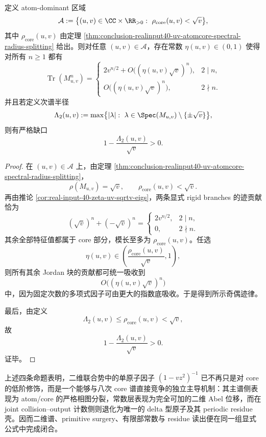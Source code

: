 \begin{theorem}\label{thm:conclusion-realinput40-uv-atom-dominant-trace-law}
定义 atom-dominant 区域
\[
\mathcal A:=
\bigl\{(u,v)\in\CC\times\RR_{>0}:\ \rho_{\mathrm{core}}(u,v)<\sqrt v\bigr\},
\]
其中 \(\rho_{\mathrm{core}}(u,v)\) 由定理 \ref{thm:conclusion-realinput40-uv-atomcore-spectral-radius-splitting} 给出。则对任意 \((u,v)\in\mathcal A\)，存在常数 \(\eta(u,v)\in(0,1)\) 使得对所有 \(n\ge 1\) 都有
\[
\operatorname{Tr}(M_{u,v}^n)=
\begin{cases}
2v^{n/2}+O\!\bigl((\eta(u,v)\sqrt v)^n\bigr),& 2\mid n,\\[4pt]
O\!\bigl((\eta(u,v)\sqrt v)^n\bigr),& 2\nmid n.
\end{cases}
\]
并且若定义次谱半径
\[
\Lambda_2(u,v):=
\max\bigl\{|\lambda|:\ \lambda\in\Spec(M_{u,v})\setminus\{\pm\sqrt v\}\bigr\},
\]
则有严格缺口
\[
\boxed{\;
1-\frac{\Lambda_2(u,v)}{\sqrt v}>0.\;}
\]
\end{theorem}
\begin{proof}
在 \((u,v)\in\mathcal A\) 上，由定理 \ref{thm:conclusion-realinput40-uv-atomcore-spectral-radius-splitting}，
\[
\rho(M_{u,v})=\sqrt v,
\qquad
\rho_{\mathrm{core}}(u,v)<\sqrt v.
\]
再由推论 \ref{cor:real-input-40-zeta-uv-sqrtv-eigs}，两条显式 rigid branches 的迹贡献恰为
\[
(\sqrt v)^n+(-\sqrt v)^n
=
\begin{cases}
2v^{n/2},&2\mid n,\\
0,&2\nmid n.
\end{cases}
\]
其余全部特征值都属于 core 部分，模长至多为 \(\rho_{\mathrm{core}}(u,v)\)。任选
\[
\eta(u,v)\in\left(\frac{\rho_{\mathrm{core}}(u,v)}{\sqrt v},1\right),
\]
则所有其余 Jordan 块的贡献都可统一吸收到
\[
O\!\bigl((\eta(u,v)\sqrt v)^n\bigr)
\]
中，因为固定次数的多项式因子可由更大的指数底吸收。于是得到所示奇偶迹律。

最后，由定义
\[
\Lambda_2(u,v)\le \rho_{\mathrm{core}}(u,v)<\sqrt v,
\]
故
\[
1-\frac{\Lambda_2(u,v)}{\sqrt v}>0.
\]
证毕。
\end{proof}

上述四条命题表明，二维联合势中的单原子因子 \((1-vz^2)^{-1}\) 已不再只是对 core 的低阶修饰，而是一个能够与八次 core 谱直接竞争的独立主导机制：其主谱侧表现为 atom/core 的严格相图分裂，常数层表现为完全可加的二维 Abel 位移，而在 joint collision--output 计数侧则退化为唯一的 delta 型原子及其 periodic residue 壳。因而二维谱、primitive surgery、有限部常数与 residue 读出便在同一组显式公式中完成闭合。

\endinput
